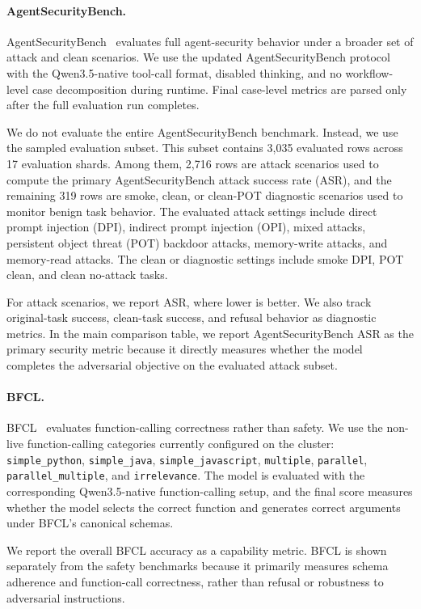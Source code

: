 \documentclass{llmxive}
\begin{document}
\paragraph{AgentSecurityBench.}
AgentSecurityBench~\citep{zhang2025agent} evaluates full agent-security behavior under a broader set of attack and clean scenarios. We use the updated AgentSecurityBench protocol with the Qwen3.5-native tool-call format, disabled thinking, and no workflow-level case decomposition during runtime. Final case-level metrics are parsed only after the full evaluation run completes.

We do not evaluate the entire AgentSecurityBench benchmark. Instead, we use the sampled evaluation subset. This subset contains 3,035 evaluated rows across 17 evaluation shards. Among them, 2,716 rows are attack scenarios used to compute the primary AgentSecurityBench attack success rate (ASR), and the remaining 319 rows are smoke, clean, or clean-POT diagnostic scenarios used to monitor benign task behavior. The evaluated attack settings include direct prompt injection (DPI), indirect prompt injection (OPI), mixed attacks, persistent object threat (POT) backdoor attacks, memory-write attacks, and memory-read attacks. The clean or diagnostic settings include smoke DPI, POT clean, and clean no-attack tasks.

For attack scenarios, we report ASR, where lower is better. We also track original-task success, clean-task success, and refusal behavior as diagnostic metrics. In the main comparison table, we report AgentSecurityBench ASR as the primary security metric because it directly measures whether the model completes the adversarial objective on the evaluated attack subset.

\paragraph{BFCL.}
BFCL~\citep{patil2025bfcl} evaluates function-calling correctness rather than safety. We use the non-live function-calling categories currently configured on the cluster: \texttt{simple\_python}, \texttt{simple\_java}, \texttt{simple\_javascript}, \texttt{multiple}, \texttt{parallel}, \texttt{parallel\_multiple}, and \texttt{irrelevance}. The model is evaluated with the corresponding Qwen3.5-native function-calling setup, and the final score measures whether the model selects the correct function and generates correct arguments under BFCL's canonical schemas.

We report the overall BFCL accuracy as a capability metric. BFCL is shown separately from the safety benchmarks because it primarily measures schema adherence and function-call correctness, rather than refusal or robustness to adversarial instructions.
\end{document}
